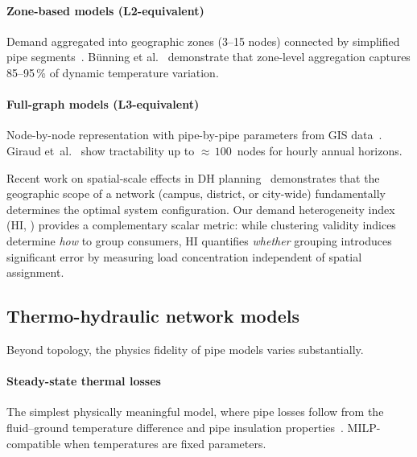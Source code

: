 \documentclass[review,3p]{elsarticle}
\begin{document}
\paragraph{Zone-based models (L2-equivalent)}
Demand aggregated into geographic zones (3--15 nodes) connected by
simplified pipe
segments~\cite{Wirtz2020,Mertz2016,Buffa2019}. Bünning et
al.~\cite{Buenning2020} demonstrate that zone-level aggregation
captures 85--95\,\% of dynamic temperature variation.

\paragraph{Full-graph models (L3-equivalent)}
Node-by-node representation with pipe-by-pipe parameters from GIS
data~\cite{Vesterlund2017,Schweiger2017,vanderHeijde2017,
Blommaert2020}. Giraud et~al.~\cite{Giraud2015} show tractability up
to ${\approx}\,100$~nodes for hourly annual horizons.

Recent work on spatial-scale effects in DH
planning~\cite{Guo2025} demonstrates that the geographic scope of a
network (campus, district, or city-wide) fundamentally determines the
optimal system configuration. Our demand heterogeneity index
(HI, ) provides a complementary scalar metric:
while clustering validity indices determine \emph{how} to group
consumers, HI quantifies \emph{whether} grouping introduces
significant error by measuring load concentration independent of
spatial assignment.

\subsection{Thermo-hydraulic network models}
\label{sec:rw_thermohydraulic}

Beyond topology, the physics fidelity of pipe models varies
substantially.

\paragraph{Steady-state thermal losses}
The simplest physically meaningful model, where pipe losses follow
from the fluid--ground temperature difference and pipe insulation
properties~\cite{Paalsson1999,Frederiksen2013}. MILP-compatible when
temperatures are fixed parameters.
\end{document}
